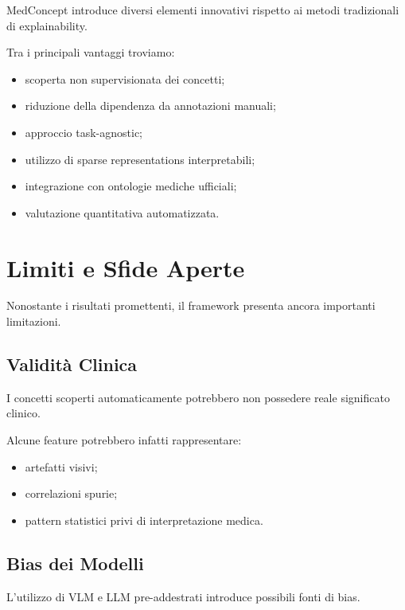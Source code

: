 MedConcept introduce diversi elementi innovativi rispetto ai metodi tradizionali di explainability.

Tra i principali vantaggi troviamo:

\begin{itemize}
    \item scoperta non supervisionata dei concetti;
    
    \item riduzione della dipendenza da annotazioni manuali;
    
    \item approccio task-agnostic;
    
    \item utilizzo di sparse representations interpretabili;
    
    \item integrazione con ontologie mediche ufficiali;
    
    \item valutazione quantitativa automatizzata.
\end{itemize}

\section{Limiti e Sfide Aperte}

Nonostante i risultati promettenti, il framework presenta ancora importanti limitazioni.

\subsection{Validità Clinica}

I concetti scoperti automaticamente potrebbero non possedere reale significato clinico.

Alcune feature potrebbero infatti rappresentare:

\begin{itemize}
    \item artefatti visivi;
    \item correlazioni spurie;
    \item pattern statistici privi di interpretazione medica.
\end{itemize}

\subsection{Bias dei Modelli}

L'utilizzo di VLM e LLM pre-addestrati introduce possibili fonti di bias.

